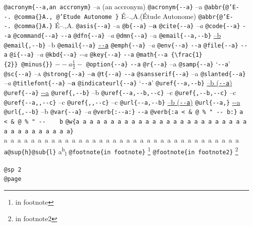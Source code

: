 \documentclass{book}
\newcommand\Texinfocommandstyletextcite[1]{{\normalfont{}\textsl{#1}}}%
\newcommand\Texinfocommandstyletextkbd[1]{{\ttfamily\textsl{#1}}}%
\newcommand\Texinfocommandstyletextvar[1]{{\normalfont{}\textsl{#1}}}%
\renewcommand{\_}{\Texinfounderscore\discretionary{}{}{}}
\begin{document}
{\texttt{@acronym\{{-}{-}a,an accronym\}} --a (an accronym)
\texttt{@acronym\{{-}{-}a\}} --a
\texttt{@abbr\{@'E{-}{-}.\ @comma\{\}A.,\ @'Etude Autonome \}} \'{E}--.\@ ,A.\@ (\'{E}tude Autonome)
\texttt{@abbr\{@'E{-}{-}.\ @comma\{\}A.\}} \'{E}--.\@ ,A.\@
\texttt{@asis\{{-}{-}a\}} --a
\texttt{@b\{{-}{-}a\}} \textbf{--a}
\texttt{@cite\{{-}{-}a\}} \Texinfocommandstyletextcite{--a}
\texttt{@code\{{-}{-}a\}} \texttt{{-}{-}a}
\texttt{@command\{{-}{-}a\}} \texttt{{-}{-}a}
\texttt{@dfn\{{-}{-}a\}} \textsl{--a}
\texttt{@dmn\{{-}{-}a\}} \thinspace --a
\texttt{@email\{{-}{-}a,{-}{-}b\}} \href{mailto:--a}{--b}
\texttt{@email\{,{-}{-}b\}} --b
\texttt{@email\{{-}{-}a\}} \href{mailto:--a}{\nolinkurl{--a}}
\texttt{@emph\{{-}{-}a\}} \emph{--a}
\texttt{@env\{{-}{-}a\}} \texttt{{-}{-}a}
\texttt{@file\{{-}{-}a\}} \texttt{{-}{-}a}
\texttt{@i\{{-}{-}a\}} \textit{--a}
\texttt{@kbd\{{-}{-}a\}} \Texinfocommandstyletextkbd{{-}{-}a}
\texttt{@key\{{-}{-}a\}} \texttt{{-}{-}a}
\texttt{@math\{{-}{-}a \{\textbackslash{}frac\{1\}\{2\}\}\ @minus\{\}\}} $--a {\frac{1}{2}} -$
\texttt{@option\{{-}{-}a\}} \texttt{{-}{-}a}
\texttt{@r\{{-}{-}a\}} \textnormal{--a}
\texttt{@samp\{{-}{-}a\}} `\texttt{{-}{-}a}'
\texttt{@sc\{{-}{-}a\}} \textsc{--a}
\texttt{@strong\{{-}{-}a\}} \textbf{--a}
\texttt{@t\{{-}{-}a\}} \texttt{{-}{-}a}
\texttt{@sansserif\{{-}{-}a\}} \textsf{--a}
\texttt{@slanted\{{-}{-}a\}} \textsl{--a}
\texttt{@titlefont\{{-}{-}a\}} {\huge \bfseries --a}
\texttt{@indicateurl\{{-}{-}a\}} `\texttt{{-}{-}a}'
\texttt{@uref\{{-}{-}a,{-}{-}b\}} \href{--a}{--b (\nolinkurl{--a})}
\texttt{@uref\{{-}{-}a\}} \url{--a}
\texttt{@uref\{,{-}{-}b\}} --b
\texttt{@uref\{{-}{-}a,{-}{-}b,{-}{-}c\}} --c
\texttt{@uref\{,{-}{-}b,{-}{-}c\}} --c
\texttt{@uref\{{-}{-}a{,}{,}{-}{-}c\}} --c
\texttt{@uref\{{,}{,}{-}{-}c\}} --c
\texttt{@url\{{-}{-}a,{-}{-}b\}} \href{--a}{--b (\nolinkurl{--a})}
\texttt{@url\{{-}{-}a,\}} \url{--a}
\texttt{@url\{,{-}{-}b\}} --b
\texttt{@var\{{-}{-}a\}} \Texinfocommandstyletextvar{--a}
\texttt{@verb\{:{-}{-}a:\}} \verb:--a:
\texttt{@verb\{:a  < \& @\ \% " {-}{-}    b:\}} \verb:a  < & @ % " --    b:
\texttt{@w\{a a a a a a a a a a a a a a a a a a a a a a a a a a a a a a a a a a a\}} \hbox{a a a a a a a a a a a a a a a a a a a a a a a a a a a a a a a a a a a}
\texttt{a@sup\{h\}@sub\{l\}} a\textsuperscript{h}\textsubscript{l}
\texttt{@footnote\{in footnote\}} \footnote{in footnote}
\texttt{@footnote\{in footnote2\}} \footnote{in footnote2}

\texttt{@sp 2}\leavevmode{}\\
\baselineskip %
\texttt{@page}\leavevmode{}\\
\newpage{}%
\phantom{blabla}%

}
\end{document}

